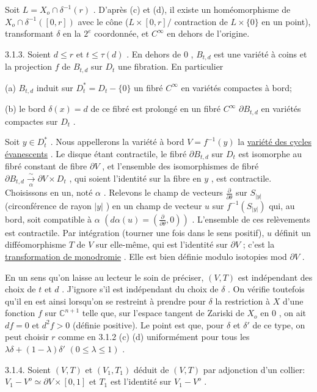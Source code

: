 Soit $L = X_o \cap \delta^{-1}(r)$ . D'après (c) et (d), il existe un homéomorphisme de $X_o \cap \delta^{-1}([0, r])$ avec le cône ($L \times [0, r]/$ contraction de $L \times \{0\}$ en un point), transformant $\delta$ en la $2^e$ coordonnée, et $C^\infty$ en dehors de l'origine.

3.1.3. Soient $d \leq r$ et $t \leq \tau(d)$ . En dehors de $0$ , $B_{t,d}$ est une variété à coins et la projection $f$ de $B_{t,d}$ sur $D_t$ une fibration. En particulier

(a) $B_{t,d}$ induit sur $D_t^* = D_t - \{0\}$ un fibré $C^\infty$ en variétés compactes à bord;

(b) le bord $\delta(x) = d$ de ce fibré est prolongé en un fibré $C^\infty$ $\partial B_{t,d}$ en variétés compactes sur $D_t$ .

Soit $y \in D_t^*$ . Nous appellerons la variété à bord $V = f^{-1}(y)$ la \underline{variété des cycles évanescents} . Le disque étant contractile, le fibré $\partial B_{t,d}$ sur $D_t$ est isomorphe au fibré constant de fibre $\partial V$ , et l'ensemble des isomorphismes de fibré $\partial B_{t,d} \xrightarrow[\alpha]{\sim} \partial V \times D_t$ , qui soient l'identité sur la fibre en $y$ , est contractile. Choisissons en un, noté $\alpha$ . Relevons le champ de vecteurs $\frac{\partial}{\partial\theta}$ sur $S_{|y|}$ (circonférence de rayon $|y|$ ) en un champ de vecteur $u$ sur $f^{-1}(S_{|y|})$ qui, au bord, soit compatible à $\alpha$ $(d\alpha(u) = (\frac{\partial}{\partial\theta} , 0))$ . L'ensemble de ces relèvements est contractile. Par intégration (tourner une fois dans le sens positif), $u$ définit un difféomorphisme $T$ de $V$ sur elle-même, qui est l'identité sur $\partial V$ ; c'est la \underline{transformation de monodromie} . Elle est bien définie modulo isotopies mod $\partial V$ .

En un sens qu'on laisse au lecteur le soin de préciser, $(V, T)$ est indépendant des choix de $t$ et $d$ . J'ignore s'il est indépendant du choix de $\delta$ . On vérifie toutefois qu'il en est ainsi lorsqu'on se restreint à prendre pour $\delta$ la restriction à $X$ d'une fonction $f$ sur $\mathbb{C}^{n+1}$ telle que, sur l'espace tangent de Zariski de $X_o$ en $0$ , on ait $df = 0$ et $d^2f > 0$ (définie positive). Le point est que, pour $\delta$ et $\delta'$ de ce type, on peut choisir $r$ comme en 3.1.2 (c) (d) uniformément pour tous les $\lambda\delta + (1-\lambda)\delta'$ $(0 \leq \lambda \leq 1)$ .

3.1.4. Soient $(V, T)$ et $(V_1, T_1)$ déduit de $(V, T)$ par adjonction d'un collier:
$V_1 - V^o \simeq \partial V \times [0, 1]$ et $T_1$ est l'identité sur $V_1 - V^o$ .

